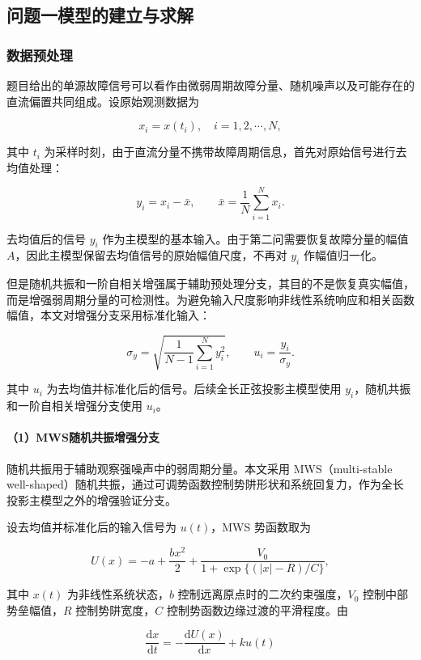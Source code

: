 \subsection{问题一模型的建立与求解}


\subsubsection{数据预处理}


题目给出的单源故障信号可以看作由微弱周期故障分量、随机噪声以及可能存在的直流偏置共同组成。设原始观测数据为


\[
x_i=x(t_i),\quad i=1,2,\cdots,N,
\]


其中 \(t_i\) 为采样时刻，由于直流分量不携带故障周期信息，首先对原始信号进行去均值处理：


\[
y_i=x_i-\bar{x},\qquad 
\bar{x}=\frac{1}{N}\sum_{i=1}^{N}x_i.
\]


去均值后的信号 \(y_i\) 作为主模型的基本输入。由于第二问需要恢复故障分量的幅值 \(A\)，因此主模型保留去均值信号的原始幅值尺度，不再对 \(y_i\) 作幅值归一化。


但是随机共振和一阶自相关增强属于辅助预处理分支，其目的不是恢复真实幅值，而是增强弱周期分量的可检测性。为避免输入尺度影响非线性系统响应和相关函数幅值，本文对增强分支采用标准化输入：


\[
\sigma_y=\sqrt{\frac{1}{N-1}\sum_{i=1}^{N}y_i^2},
\qquad
u_i=\frac{y_i}{\sigma_y}.
\]


其中 \(u_i\) 为去均值并标准化后的信号。后续全长正弦投影主模型使用 \(y_i\)，随机共振和一阶自相关增强分支使用 \(u_i\)。


\paragraph{（1）MWS随机共振增强分支}


随机共振用于辅助观察强噪声中的弱周期分量。本文采用 MWS（multi-stable well-shaped）随机共振，通过可调势函数控制势阱形状和系统回复力，作为全长投影主模型之外的增强验证分支。


设去均值并标准化后的输入信号为 \(u(t)\)，MWS 势函数取为


\[
U(x)=-a+\frac{b x^2}{2}+
\frac{V_0}{1+\exp\{(|x|-R)/C\}},
\]


其中 \(x(t)\) 为非线性系统状态，\(b\) 控制远离原点时的二次约束强度，\(V_0\) 控制中部势垒幅值，\(R\) 控制势阱宽度，\(C\) 控制势函数边缘过渡的平滑程度。由


\[
\frac{\mathrm{d}x}{\mathrm{d}t}
=-\frac{\mathrm{d}U(x)}{\mathrm{d}x}+k u(t)
\]


